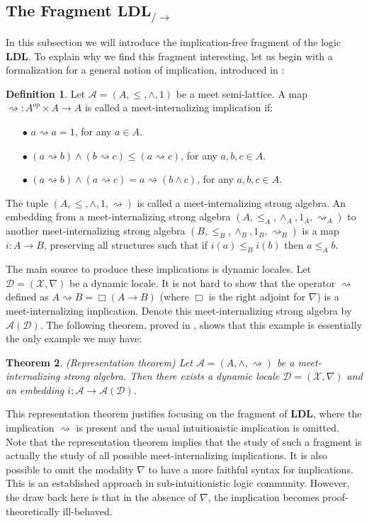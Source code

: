 \documentclass[12pt,a4paper]{article}
\theoremstyle{plain}
\newtheorem{thm}{Theorem}[section]
\theoremstyle{definition}
\newtheorem{dfn}[thm]{Definition}
\begin{document}
\subsection{The Fragment $\mathbf{LDL}_{/\rightarrow}$}\label{sec:ldls}
In this subsection we will introduce the implication-free fragment of the logic $\mathbf{LDL}$. To explain why we find this fragment interesting, let us begin with a formalization for a general notion of implication, introduced in \cite{Amir}:
\begin{dfn}
Let $\mathcal{A}=(A, \leq, \wedge, 1)$ be a meet semi-lattice. A map $\rightsquigarrow : A^{op} \times A \to A$ is called a meet-internalizing implication if:
\begin{itemize}
\item[$\bullet$]
$a \rightsquigarrow a=1$, for any $a \in A$.
\item[$\bullet$]
$(a \rightsquigarrow b) \wedge (b \rightsquigarrow c) \leq (a \rightsquigarrow c)$, for any $a, b, c \in A$.
\item[$\bullet$]
$(a \rightsquigarrow b) \wedge (a \rightsquigarrow c)= a \rightsquigarrow (b \wedge c)$, for any $a, b, c \in A$.
\end{itemize}
The tuple $(A, \leq, \wedge, 1, \rightsquigarrow)$ is called a meet-internalizing strong algebra. An embedding from a meet-internalizing strong algebra $(A, \leq_A, \wedge_A, 1_A, \rightsquigarrow_A)$ to another meet-internalizing strong algebra $(B, \leq_B, \wedge_B, 1_B, \rightsquigarrow_B)$ is a map $i : A \to B$, preserving all structures such that if $i(a) \leq_B i(b)$ then $a \leq_A b$.
\end{dfn}
The main source to produce these implications is dynamic locales. Let $\mathcal{D}=(\mathscr{X}, \nabla)$ be a dynamic locale. It is not hard to show that the operator $\rightsquigarrow$ defined as $A \rightsquigarrow B = \Box (A \rightarrow B)$ (where $\Box$ is the right adjoint for $\nabla$) is a meet-internalizing implication. Denote this meet-internalizing strong algebra by $\mathcal{A}(\mathcal{D})$. The following theorem, proved in \cite{Amir}, shows that this example is essentially the only example we may have:
\begin{thm}(Representation theorem)
Let $\mathcal{A}=(A, \wedge, \rightsquigarrow)$ be a meet-internalizing strong algebra. Then there exists a dynamic locale $\mathcal{D}=(\mathscr{X}, \nabla)$ and an embedding $i: \mathcal{A} \to \mathcal{A}(\mathcal{D})$.
\end{thm}

This representation theorem justifies focusing on the fragment of $\mathbf{LDL}$, where the implication $\rightsquigarrow$ is present and the usual intuitionistic implication is omitted. Note that the representation theorem implies that the study of such a fragment is actually the study of all possible meet-internalizing implications. It is also possible to omit the modality $\nabla$ to have a more faithful syntax for implications. This is an established approach in sub-intuitionistic logic community. However, the draw back here is that in the absence of $\nabla$, the implication becomes proof-theoretically ill-behaved.
\end{document}
